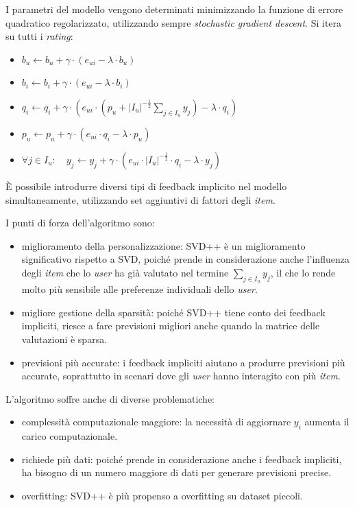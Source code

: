 I parametri del modello vengono determinati minimizzando la funzione di errore quadratico regolarizzato, utilizzando sempre \textit{stochastic gradient descent}. Si itera su tutti i \textit{rating}:

\begin{itemize}
  \item $b_u \leftarrow b_u + \gamma \cdot (e_{ui} - \lambda \cdot b_u)$
  \item $b_i \leftarrow b_i + \gamma \cdot (e_{ui} - \lambda \cdot b_i)$
  \item $q_i \leftarrow q_i + \gamma \cdot \left( e_{ui} \cdot \left( p_u + |I_u|^{-\frac{1}{2}} \sum\limits_{j \in I_u} y_j \right) - \lambda \cdot q_i \right)$
  \item $p_u \leftarrow p_u + \gamma \cdot (e_{ui} \cdot q_i - \lambda \cdot p_u)$
  \item $\forall j \in I_u: \quad y_j \leftarrow y_j + \gamma \cdot \left( e_{ui} \cdot |I_u|^{-\frac{1}{2}} \cdot q_i - \lambda \cdot y_j \right)$
\end{itemize}

È possibile introdurre diversi tipi di feedback implicito nel modello simultaneamente, utilizzando set aggiuntivi di fattori degli \textit{item}.

I punti di forza dell'algoritmo sono:

\begin{itemize}
    \item miglioramento della personalizzazione: SVD++ è un miglioramento significativo rispetto a SVD, poiché prende in considerazione anche l'influenza degli \textit{item} che lo \textit{user} ha già valutato nel termine $\sum\limits_{j \in I_u} y_j$, il che lo rende molto più sensibile alle preferenze individuali dello \textit{user}.
    \item migliore gestione della sparsità: poiché SVD++ tiene conto dei feedback impliciti, riesce a fare previsioni migliori anche quando la matrice delle valutazioni è sparsa.
    \item previsioni più accurate: i feedback impliciti aiutano a produrre previsioni più accurate, soprattutto in scenari dove gli \textit{user} hanno interagito con più \textit{item}.
\end{itemize}

L'algoritmo soffre anche di diverse problematiche:

\begin{itemize}
    \item complessità computazionale maggiore: la necessità di aggiornare $y_i$ aumenta il carico computazionale.
    \item richiede più dati: poiché prende in considerazione anche i feedback impliciti, ha bisogno di un numero maggiore di dati per generare previsioni precise.
    \item overfitting: SVD++ è più propenso a overfitting su dataset piccoli.
\end{itemize}

